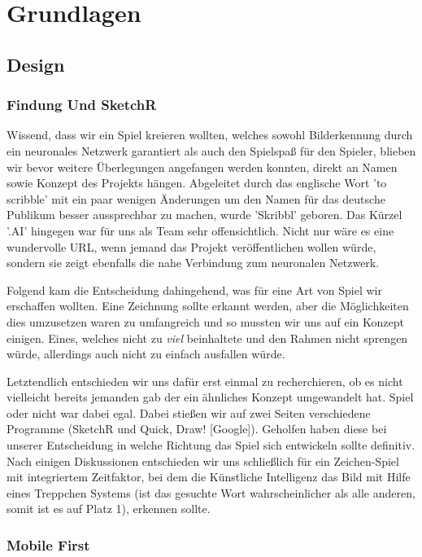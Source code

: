 \documentclass[11pt]{article}
\begin{document}
\section{Grundlagen}
\subsection{Design}
\subsubsection{Findung Und SketchR}

Wissend, dass wir ein Spiel kreieren wollten, welches sowohl Bilderkennung durch ein neuronales Netzwerk garantiert als auch den Spielspaß für den Spieler, blieben wir bevor weitere Überlegungen angefangen werden konnten, direkt an Namen sowie Konzept des Projekts hängen. 
Abgeleitet durch das englische Wort 'to scribble' mit ein paar wenigen Änderungen um den Namen für das deutsche Publikum besser aussprechbar zu machen, wurde 'Skribbl' geboren. Das Kürzel '.AI' hingegen war für uns als Team sehr offensichtlich. Nicht nur wäre es eine wundervolle URL, wenn jemand das Projekt veröffentlichen wollen würde, sondern sie zeigt ebenfalls die nahe Verbindung zum neuronalen Netzwerk.

Folgend kam die Entscheidung dahingehend, was für eine Art von Spiel wir erschaffen wollten. Eine Zeichnung sollte erkannt werden, aber die Möglichkeiten dies umzusetzen waren zu umfangreich und so mussten wir uns auf ein Konzept einigen. Eines, welches nicht zu \textit{viel} beinhaltete und den Rahmen nicht sprengen würde, allerdings auch nicht zu einfach ausfallen würde. 

Letztendlich entschieden wir uns dafür erst einmal zu recherchieren, ob es nicht vielleicht bereits jemanden gab der ein ähnliches Konzept umgewandelt hat. Spiel oder nicht war dabei egal. 
Dabei stießen wir auf zwei Seiten verschiedene Programme (SketchR und Quick, Draw! [Google]). Geholfen haben diese bei unserer Entscheidung in welche Richtung das Spiel sich entwickeln sollte definitiv. Nach einigen Diskussionen entschieden wir uns schließlich für ein Zeichen-Spiel mit integriertem Zeitfaktor, bei dem die Künstliche Intelligenz das Bild mit Hilfe eines Treppchen Systems (ist das gesuchte Wort wahrscheinlicher als alle anderen, somit ist es auf Platz 1), erkennen sollte. 

\subsubsection{Mobile First}
\end{document}

